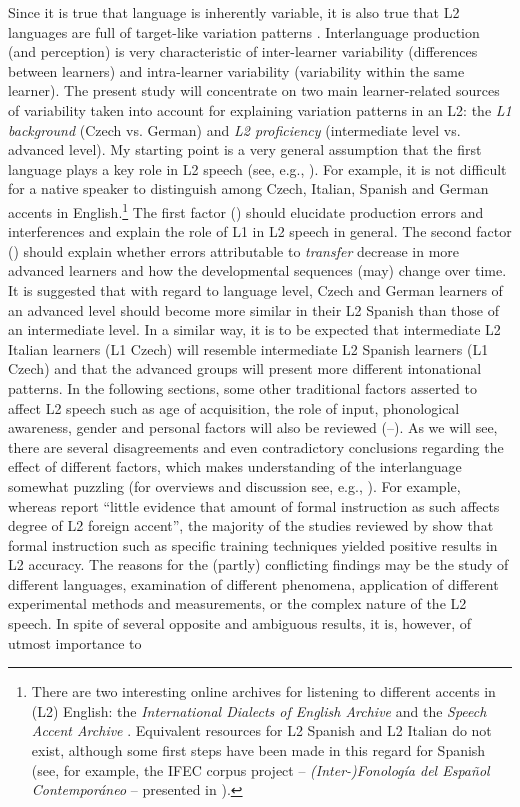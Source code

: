 Since it is true that language is inherently variable, it is also true that L2 languages are full of target-like variation patterns \citep[272]{Regan2013}.  Interlanguage production (and perception) is very characteristic of inter-learner variability (differences between learners) and intra-learner variability (variability within the same learner). The present study will concentrate on two main learner-related sources of variability taken into account for explaining variation patterns in an L2: the \textit{L1 background} (Czech vs. German) and \textit{L2 proficiency} (intermediate level vs. advanced level). My starting point is a very general assumption that the first language plays a key role in L2 speech (see, e.g., \citealt{Suter1976}). For example, it is not difficult for a native speaker to distinguish among Czech, Italian, Spanish and German accents in English.\footnote{There are two interesting online archives for listening to different accents in (L2) English: the \textit{International Dialects of English Archive} \citep{Meier1998} and the \textit{Speech Accent Archive} \citep{Weinberger2015}. Equivalent resources for L2 Spanish and L2 Italian do not exist, although some first steps have been made in this regard for Spanish (see, for example, the IFEC corpus project -- \textit{(Inter-)Fonología del Español Contemporáneo} -- presented in ).} The first factor () should elucidate production errors and interferences and explain the role of L1 in L2 speech in general. The second factor () should explain whether errors attributable to \textit{transfer} decrease in more advanced learners and how the developmental sequences (may) change over time. It is suggested that with regard to language level, Czech and German learners of an advanced level should become more similar in their L2 Spanish than those of an intermediate level. In a similar way, it is to be expected that intermediate L2 Italian learners (L1 Czech) will resemble intermediate L2 Spanish learners (L1 Czech) and that the advanced groups will present more different intonational patterns. In the following sections, some other traditional factors asserted to affect L2 speech such as age of acquisition, the role of input, phonological awareness, gender and personal factors will also be reviewed (--). As we will see, there are several disagreements and even contradictory conclusions regarding the effect of different factors, which makes understanding of the interlanguage somewhat puzzling (for overviews and discussion see, e.g., \citealt{PiskeEtAl2001, ColantoniEtAl2015, DerwingMunro2015}). For example, whereas \citet[201]{PiskeEtAl2001} report “little evidence that amount of formal instruction as such affects degree of L2 foreign accent”, the majority of the studies reviewed by \citet{DerwingMunro2015} show that formal instruction such as specific training techniques yielded positive results in L2 accuracy. The reasons for the (partly) conflicting findings may be the study of different languages, examination of different phenomena, application of different experimental methods and measurements, or the complex nature of the L2 speech. In spite of several opposite and ambiguous results, it is, however, of utmost importance to 